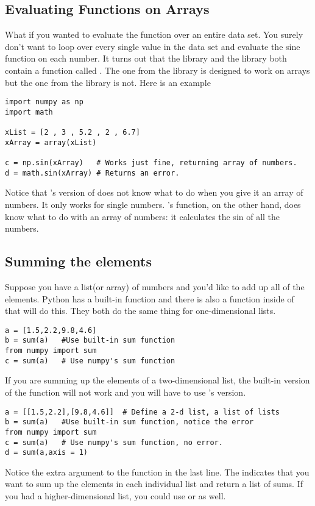 \subsection*{Evaluating Functions on Arrays}
What if you wanted to evaluate the  function over an
entire data set.  You surely don't want to loop over every single
value in the data set and evaluate the sine function on each number.
It turns out that the  library and the 
library both contain a function called .  The one from the
 library is designed to work on arrays but the one from
the  library is not. Here is an example
\begin{Verbatim}
import numpy as np
import math 

xList = [2 , 3 , 5.2 , 2 , 6.7]
xArray = array(xList)

c = np.sin(xArray)   # Works just fine, returning array of numbers.
d = math.sin(xArray) # Returns an error.
\end{Verbatim}
Notice that 's version of  does not
know what to do when you give it an array of numbers.  It only works
for single numbers.  's  function, on the
other hand, does know what to do with an array of numbers: it
calculates the sin of all the numbers.

\subsection*{Summing the elements}
Suppose you have a list(or array) of numbers and you'd like to add up
all of the elements.  Python has a built-in  function and
there is also a  function inside of  that
will do this. They both do the same thing for one-dimensional lists.
\begin{Verbatim}
a = [1.5,2.2,9.8,4.6]
b = sum(a)   #Use built-in sum function
from numpy import sum
c = sum(a)   # Use numpy's sum function
\end{Verbatim}
If you are summing up the elements of a two-dimensional list, the
built-in version of the function will not work and you will have to
use 's version.
\begin{Verbatim}
a = [[1.5,2.2],[9.8,4.6]]  # Define a 2-d list, a list of lists
b = sum(a)   #Use built-in sum function, notice the error
from numpy import sum
c = sum(a)   # Use numpy's sum function, no error.
d = sum(a,axis = 1) 
\end{Verbatim}
Notice the extra argument to the  function in the last
line.  The  indicates that you want to sum up the
elements in each individual list and return a list of sums.  If you
had a higher-dimensional list, you could use  or
 as well.
